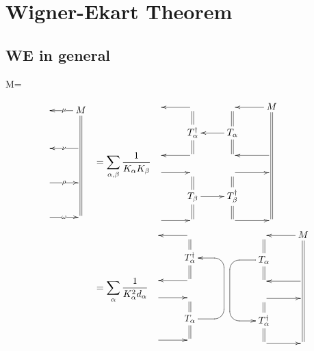\chapter{Wigner-Ekart Theorem}
\label{ch-wigner-ekart}

\section{WE in general}

\beq
M=
\bcen
{}
\ecen
\eeq

\begin{align}
\bcen
\xymatrix@R=1pc{
&M\ar@2{-}[dddddd]
\ar[l]|\mu
\\&
\\
&\ar[l]|\nu
\\&
\\
\ar[r]|\rho&
\\&
\\
\ar[r]|\omega&
}
\ecen
&=
\sum_{\alp, \beta}
\frac{1}{K_\alp K_\beta}
\bcen
\xymatrix@R=1pc{
&\ar[l]&&M
\ar@2{-}[ddddd]
\ar[l]
\\
&T_\alp^\dagger\ar@2{-}[u]
\ar@2{-}[d]&T_\alp\ar@2{-}[u]
\ar@2{-}[d]
\ar[l]
&
\\
&\ar[l]&&\ar[l]
\\
\ar[r]&&\ar[r]&
\\
&T_\beta
\ar@2{-}[u]
\ar@2{-}[d]
\ar[r]
&T_\beta^\dagger\ar@2{-}[u]
\ar@2{-}[d]
&
\\
\ar[r]&&\ar[r]&
}
\ecen
\\
&=
\sum_{\alp}
\frac{1}{K^2_\alp d_\alp}
\bcen
\xymatrix@R=1pc{
&\ar[l]&
\\
&T_\alp^\dagger\ar@2{-}[u]
\ar@2{-}[d]
&
\\
&\ar[l]&
\\
\ar[r]&&
\\
&T_\alp
\ar@2{-}[u]
\ar@2{-}[d]
\ar`r[ruuu]
`[uuu][uuu]
&
\\
\ar[r]&&
}
\xymatrix@R=1pc{
&&M
\ar@2{-}[ddddd]
\ar[l]
\\
&T_\alp\ar@2{-}[u]
\ar@2{-}[d]
\ar`l[ld]
`[ddd][ddd]
&
\\
&&\ar[l]
\\
&\ar[r]&
\\
&T_\alp^\dagger\ar@2{-}[u]
\ar@2{-}[d]
&
\\
&\ar[r]&
}
\ecen
\end{align}


